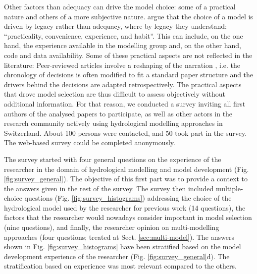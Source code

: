 \documentclass[10pt,a4paper]{article}
\begin{document}
Other factors than adequacy can drive the model choice: some of a practical nature and others of a more subjective nature. \citet{Addor2019} argue that the choice of a model is driven by legacy rather than adequacy, where by legacy they understand: ``practicality, convenience, experience, and habit''. This can include, on the one hand, the experience available in the modelling group and, on the other hand, code and data availability. Some of these practical aspects are not reflected in the literature: Peer-reviewed articles involve a reshaping of the narration \citep{Pontille2007, Rinck2010, Babel2019}, i.e. the chronology of decisions is often modified to fit a standard paper structure and the drivers behind the decisions are adapted retrospectively. The practical aspects that drove model selection are thus difficult to assess objectively without additional information. For that reason, we conducted a survey inviting all first authors of the analysed papers to participate, as well as other actors in the research community actively using hydrological modelling approaches in Switzerland. About 100 persons were contacted, and 50 took part in the survey. The web-based survey could be completed anonymously.

The survey started with four general questions on the experience of the researcher in the domain of hydrological modelling and model development (Fig. \ref{fig:survey_general}). The objective of this first part was to provide a context to the answers given in the rest of the survey. The survey then included multiple-choice questions (Fig. \ref{fig:survey_histograms}) addressing the choice of the hydrological model used by the researcher for previous work (14 questions), the factors that the researcher would nowadays consider important in model selection (nine questions), and finally, the researcher opinion on multi-modelling approaches (four questions; treated at Sect. \ref{sec:multi-model}). The answers shown in Fig. \ref{fig:survey_histograms} have been stratified based on the model development experience of the researcher (Fig. \ref{fig:survey_general}d). The stratification based on experience was most relevant compared to the others.
\end{document}
